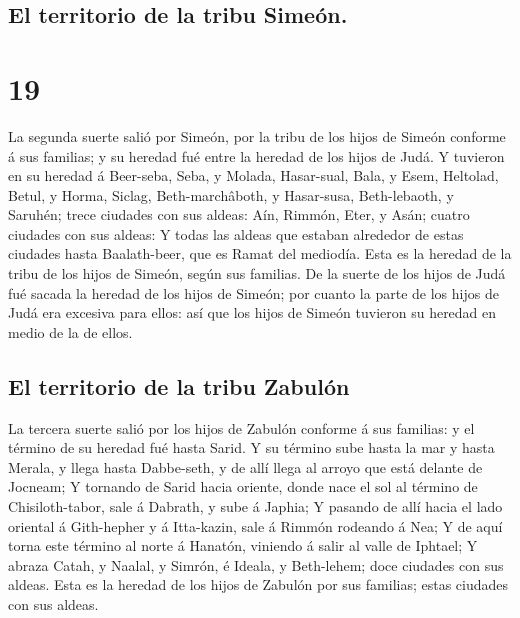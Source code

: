 \hypertarget{el-territorio-de-la-tribu-simeuxf3n.}{%
\subsection{El territorio de la tribu
Simeón.}\label{el-territorio-de-la-tribu-simeuxf3n.}}

\hypertarget{section-18}{%
\section{19}\label{section-18}}

 La segunda suerte salió por Simeón, por la tribu de los
hijos de Simeón conforme á sus familias; y su heredad fué entre la
heredad de los hijos de Judá.  Y tuvieron en su heredad á
Beer-seba, Seba, y Molada,  Hasar-sual, Bala, y Esem,
 Heltolad, Betul, y Horma,  Siclag,
Beth-marchâboth, y Hasar-susa,  Beth-lebaoth, y Saruhén;
trece ciudades con sus aldeas:  Aín, Rimmón, Eter, y Asán;
cuatro ciudades con sus aldeas:  Y todas las aldeas que
estaban alrededor de estas ciudades hasta Baalath-beer, que es Ramat del
mediodía. Esta es la heredad de la tribu de los hijos de Simeón, según
sus familias.  De la suerte de los hijos de Judá fué sacada
la heredad de los hijos de Simeón; por cuanto la parte de los hijos de
Judá era excesiva para ellos: así que los hijos de Simeón tuvieron su
heredad en medio de la de ellos.

\hypertarget{el-territorio-de-la-tribu-zabuluxf3n}{%
\subsection{El territorio de la tribu
Zabulón}\label{el-territorio-de-la-tribu-zabuluxf3n}}

 La tercera suerte salió por los hijos de Zabulón conforme
á sus familias: y el término de su heredad fué hasta Sarid.
 Y su término sube hasta la mar y hasta Merala, y llega
hasta Dabbe-seth, y de allí llega al arroyo que está delante de Jocneam;
 Y tornando de Sarid hacia oriente, donde nace el sol al
término de Chisiloth-tabor, sale á Dabrath, y sube á Japhia;
 Y pasando de allí hacia el lado oriental á Gith-hepher y á
Itta-kazin, sale á Rimmón rodeando á Nea;  Y de aquí torna
este término al norte á Hanatón, viniendo á salir al valle de Iphtael;
 Y abraza Catah, y Naalal, y Simrón, é Ideala, y
Beth-lehem; doce ciudades con sus aldeas.  Esta es la
heredad de los hijos de Zabulón por sus familias; estas ciudades con sus
aldeas.


